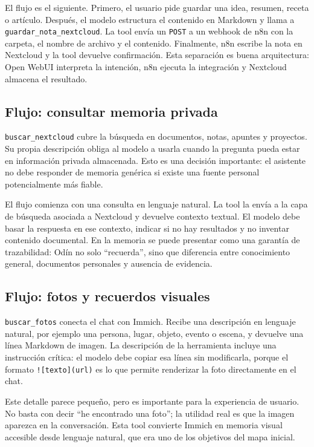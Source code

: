 El flujo es el siguiente. Primero, el usuario pide guardar una idea, resumen, receta o artículo. Después, el modelo estructura el contenido en Markdown y llama a \texttt{guardar\_nota\_nextcloud}. La tool envía un \texttt{POST} a un webhook de n8n con la carpeta, el nombre de archivo y el contenido. Finalmente, n8n escribe la nota en Nextcloud y la tool devuelve confirmación. Esta separación es buena arquitectura: Open WebUI interpreta la intención, n8n ejecuta la integración y Nextcloud almacena el resultado.

\subsection{Flujo: consultar memoria privada}
\texttt{buscar\_nextcloud} cubre la búsqueda en documentos, notas, apuntes y proyectos. Su propia descripción obliga al modelo a usarla cuando la pregunta pueda estar en información privada almacenada. Esto es una decisión importante: el asistente no debe responder de memoria genérica si existe una fuente personal potencialmente más fiable.

El flujo comienza con una consulta en lenguaje natural. La tool la envía a la capa de búsqueda asociada a Nextcloud y devuelve contexto textual. El modelo debe basar la respuesta en ese contexto, indicar si no hay resultados y no inventar contenido documental. En la memoria se puede presentar como una garantía de trazabilidad: Odín no solo ``recuerda'', sino que diferencia entre conocimiento general, documentos personales y ausencia de evidencia.

\subsection{Flujo: fotos y recuerdos visuales}
\texttt{buscar\_fotos} conecta el chat con Immich. Recibe una descripción en lenguaje natural, por ejemplo una persona, lugar, objeto, evento o escena, y devuelve una línea Markdown de imagen. La descripción de la herramienta incluye una instrucción crítica: el modelo debe copiar esa línea sin modificarla, porque el formato \texttt{![texto](url)} es lo que permite renderizar la foto directamente en el chat.

Este detalle parece pequeño, pero es importante para la experiencia de usuario. No basta con decir ``he encontrado una foto''; la utilidad real es que la imagen aparezca en la conversación. Esta tool convierte Immich en memoria visual accesible desde lenguaje natural, que era uno de los objetivos del mapa inicial.

